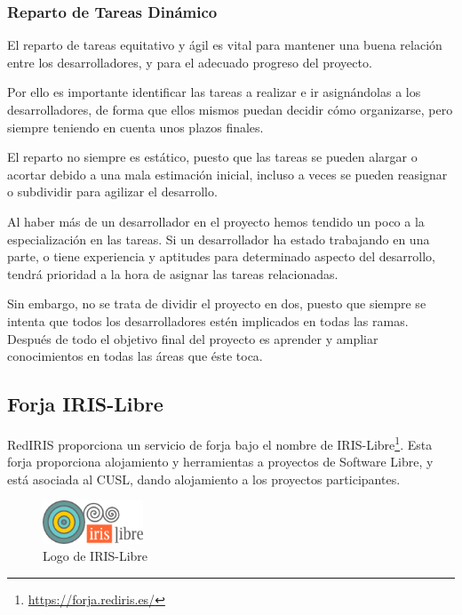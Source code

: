 
\subsubsection*{Reparto de Tareas Dinámico}

El reparto de tareas equitativo y ágil es vital para mantener una buena
relación entre los desarrolladores, y para el adecuado progreso del proyecto.

Por ello es importante identificar las tareas a realizar e ir asignándolas a
los desarrolladores, de forma que ellos mismos puedan decidir cómo organizarse,
pero siempre teniendo en cuenta unos plazos finales.

El reparto no siempre es estático, puesto que las tareas se pueden alargar o
acortar debido a una mala estimación inicial, incluso a veces se pueden
reasignar o subdividir para agilizar el desarrollo.

Al haber más de un desarrollador en el proyecto hemos tendido un poco a la
especialización en las tareas. Si un desarrollador ha estado trabajando en una
parte, o tiene experiencia y aptitudes para determinado aspecto del desarrollo,
tendrá prioridad a la hora de asignar las tareas relacionadas.

Sin embargo, no se trata de dividir el proyecto en dos, puesto que siempre se
intenta que todos los desarrolladores estén implicados en todas las ramas.
Después de todo el objetivo final del proyecto es aprender y ampliar
conocimientos en todas las áreas que éste toca.

\subsection*{Forja IRIS-Libre}

RedIRIS proporciona un servicio de forja bajo el nombre de
IRIS-Libre\footnote{\url{https://forja.rediris.es/}}. Esta forja proporciona
alojamiento y herramientas a proyectos de Software Libre, y está asociada al
CUSL, dando alojamiento a los proyectos participantes.

\begin{figure}[H]
 \centering
 \includegraphics[width=30mm]{figuras/cap5/iris_libre.png}
 \caption{Logo de IRIS-Libre}
\end{figure}

